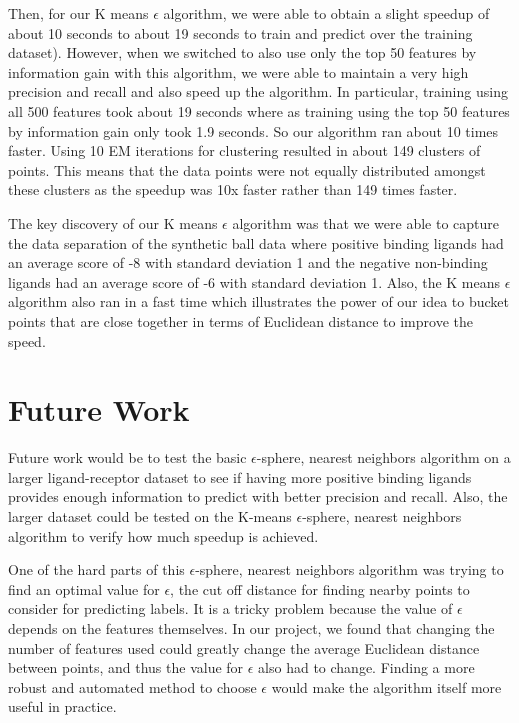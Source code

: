 \documentclass[11pt,letterpaper]{article}
\begin{document}
Then, for our K means $\epsilon$ algorithm, we were able to obtain a slight speedup of about 10%
seconds to about 19 seconds to train and predict over the training dataset).  However, when we switched to also use only the top 50 features by information gain with this algorithm, we were able to maintain a very high precision and recall and also speed up the algorithm.  In particular, training using all 500 features took about 19 seconds where as training using the top 50 features by information gain only took 1.9 seconds.  So our algorithm ran about 10 times faster.  Using 10 EM iterations for clustering resulted in about 149 clusters of points.  This means that the data points were not equally distributed amongst these clusters as the speedup was 10x faster rather than 149 times faster.

The key discovery of our K means $\epsilon$ algorithm was that we were able to capture the data separation of the synthetic ball data where positive binding ligands had an average score of -8 with standard deviation 1 and the negative non-binding ligands had an average score of -6 with standard deviation 1.  Also, the K means $\epsilon$ algorithm also ran in a fast time which illustrates the power of our idea to bucket points that are close together in terms of Euclidean distance to improve the speed.

\section{Future Work}
Future work would be to test the basic $\epsilon$-sphere, nearest neighbors algorithm on a larger ligand-receptor dataset to see if having more positive binding ligands provides enough information to predict with better precision and recall.  Also, the larger dataset could be tested on the K-means $\epsilon$-sphere, nearest neighbors algorithm to verify how much speedup is achieved.

One of the hard parts of this $\epsilon$-sphere, nearest neighbors algorithm was trying to find an optimal value for $\epsilon$, the cut off distance for finding nearby points to consider for predicting labels.  It is a tricky problem because the value of $\epsilon$ depends on the features themselves.  In our project, we found that changing the number of features used could greatly change the average Euclidean distance between points, and thus the value for $\epsilon$ also had to change.  Finding a more robust and automated method to choose $\epsilon$ would make the algorithm itself more useful in practice.
\end{document}
